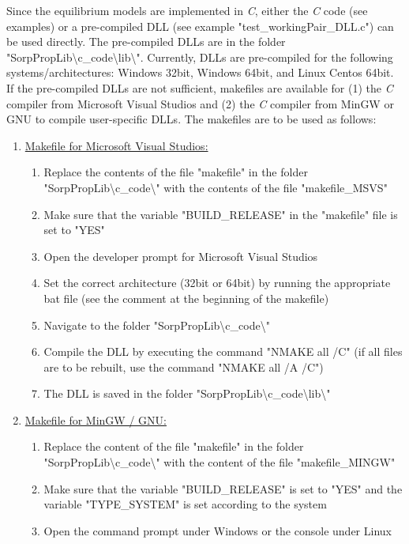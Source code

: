 Since the equilibrium models are implemented in \textit{C}, either the \textit{C} code (see examples) or a pre-compiled DLL (see example "test\_workingPair\_DLL.c") can be used directly. The pre-compiled DLLs are in the folder "SorpPropLib\textbackslash c\_code\textbackslash lib\textbackslash". Currently, DLLs are pre-compiled for the following systems/architectures: Windows 32bit, Windows 64bit, and Linux Centos 64bit. If the pre-compiled DLLs are not sufficient, makefiles are available for (1) the \textit{C} compiler from Microsoft Visual Studios and (2) the \textit{C} compiler from MinGW or GNU to compile user-specific DLLs. The makefiles are to be used as follows:
%
\begin{enumerate}
	\item \underline{Makefile for Microsoft Visual Studios:}
	\begin{enumerate}
		\item Replace the contents of the file "makefile" in the folder "SorpPropLib\textbackslash c\_code\textbackslash" with the contents of the file "makefile\_MSVS"
		\item Make sure that the variable "BUILD\_RELEASE" in the "makefile" file is set to "YES"
		\item Open the developer prompt for Microsoft Visual Studios
		\item Set the correct architecture (32bit or 64bit) by running the appropriate bat file (see the comment at the beginning of the makefile)
		\item Navigate to the folder "SorpPropLib\textbackslash c\_code\textbackslash"
		\item Compile the DLL by executing the command "NMAKE all /C" (if all files are to be rebuilt, use the command "NMAKE all /A /C")
		\item The DLL is saved in the folder "SorpPropLib\textbackslash c\_code\textbackslash lib\textbackslash"
	\end{enumerate}
	\item \underline{Makefile for MinGW / GNU:}
	\begin{enumerate}
		\item Replace the content of the file "makefile" in the folder "SorpPropLib\textbackslash c\_code\textbackslash" with the content of the file "makefile\_MINGW"
		\item Make sure that the variable "BUILD\_RELEASE" is set to "YES" and the variable "TYPE\_SYSTEM" is set according to the system
		\item Open the command prompt under Windows or the console under Linux

\end{enumerate}
\end{enumerate}
